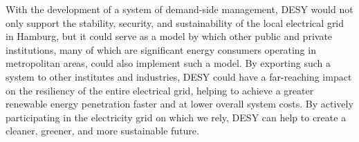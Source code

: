 \documentclass[11pt]{article}
\begin{document}
With the development of a system of demand-side management, DESY would not only support the
stability, security, and sustainability of the local electrical grid in Hamburg, but it could
serve as a model by which other public and private institutions, many of which are significant
energy consumers operating in metropolitan areas,
could also implement such a model. By exporting such a system to other institutes and industries,
DESY could have a far-reaching impact on the resiliency of the entire electrical grid, helping to
achieve a greater renewable energy penetration faster and at lower overall system costs.
By actively participating in the electricity grid on which we rely, DESY can help to create a
cleaner, greener, and more sustainable future.






\raggedright


%

\end{document}
